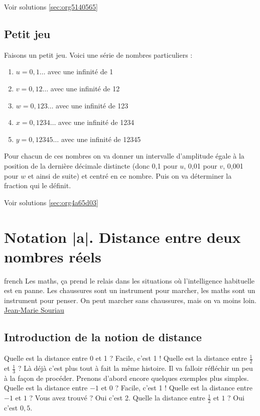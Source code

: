 \documentclass[a4paper, 11pt, twoside]{book}
\begin{document}
Voir solutions \ref{sec:org5140565}

\section{Petit jeu}
\label{sec:orgb808075}
Faisons un petit jeu. Voici une série de nombres particuliers :
\begin{enumerate}
\item \(u = 0,1\dots\) avec une infinité de 1
\item \(v = 0,12\dots\) avec une infinité de 12
\item \(w = 0,123\dots\) avec une infinité de 123
\item \(x = 0,1234\dots\) avec une infinité de 1234
\item \(y = 0,12345\dots\) avec une infinité de 12345
\end{enumerate}

Pour chacun de ces nombres on va donner un intervalle d'amplitude
égale à la position de la dernière décimale distincte (donc 0,1
pour \(u\), 0,01 pour \(v\), 0,001 pour \(w\) et ainsi de suite) et
centré en ce nombre. Puis on va déterminer la fraction qui le
définit.

Voir solutions \ref{sec:org4a65d03}
\stopcontents[level-2]

\chapter{Notation |a|. Distance entre deux nombres réels}
\label{sec:org709c246}
\startcontents[level-2]

\begin{foreigndisplayquote}{french}
Les maths, ça prend le relais dans les situations où l’intelligence
habituelle est en panne. Les chaussures sont un instrument pour
marcher, les maths sont un instrument pour penser. On peut marcher
sans chaussures, mais on va moins loin.\\
\href{https://fr.wikipedia.org/wiki/Jean-Marie\_Souriau}{Jean-Marie Souriau}
\end{foreigndisplayquote}

\section{Introduction de la notion de distance}
\label{sec:orga191266}

Quelle est la distance entre 0 et 1 ? Facile, c'est 1 ! Quelle est
la distance entre \(\frac{1}{2}\) et \(\frac{1}{3}\) ? Là déjà c'est
plus tout à fait la même histoire. Il va falloir réfléchir un peu à
la façon de procéder. Prenons d'abord encore quelques exemples plus
simples. Quelle est la distance entre \(-1\) et 0 ? Facile, c'est 1 !
Quelle est la distance entre \(-1\) et \(1\) ? Vous avez trouvé ? Oui
c'est 2. Quelle la distance entre \(\frac{1}{2}\) et \(1\) ? Oui c'est
\(0,5\).
\end{document}

